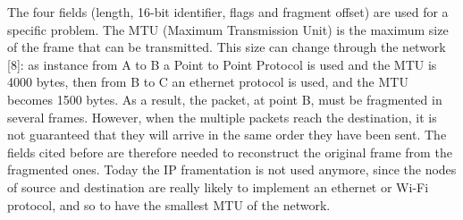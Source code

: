The four fields (length, 16-bit identifier, flags and fragment offset) are used for a specific problem. The MTU (Maximum Transmission Unit) is the maximum size of the frame that can be transmitted. This size can change through the network [8]: as instance from A to B a Point to Point Protocol is used and the MTU is 4000 bytes, then from B to C an ethernet protocol is used, and the MTU becomes 1500 bytes. As a result, the packet, at point B, must be fragmented in several frames. However, when the multiple packets reach the destination, it is not guaranteed that they will arrive in the same order they have been sent. The fields cited before are therefore needed to reconstruct the original frame from the fragmented ones. Today the IP framentation is not used anymore, since the nodes of source and destination are really likely to implement an ethernet or Wi-Fi protocol, and so to have the smallest MTU of the network.

